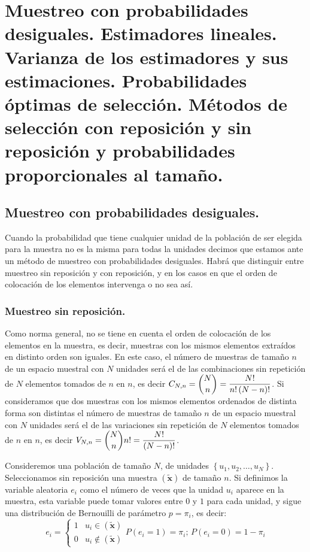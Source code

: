 
\chapter{Muestreo con probabilidades desiguales. Estimadores lineales. Varianza
de los estimadores y sus estimaciones. Probabilidades \'optimas de selecci\'on.
M\'etodos de selecci\'on con reposici\'on y sin reposici\'on y probabilidades
proporcionales al tama\~no.}


\section{Muestreo con probabilidades desiguales.}

Cuando la probabilidad que tiene cualquier unidad de la poblaci\'on
de ser elegida para la muestra no es la misma para todas la unidades
decimos que estamos ante un m\'etodo de muestreo con probabilidades
desiguales. Habr\'a que distinguir entre muestreo sin reposici\'on y con
reposici\'on, y en los casos en que el orden de colocaci\'on de los elementos
intervenga o no sea as\'i.


\subsection{Muestreo sin reposici\'on.}

Como norma general, no se tiene en cuenta el orden de colocaci\'on de
los elementos en la muestra, es decir, muestras con los mismos elementos
extra\'idos en distinto orden son iguales. En este caso, el n\'umero de
muestras de tama\~no $n$ de un espacio muestral con $N$ unidades ser\'a
el de las combinaciones sin repetici\'on de $N$ elementos tomados de
$n$ en $n$, es decir $C_{N,n}=\dbinom{N}{n}=\dfrac{N!}{n!\left(N-n\right)!}$.
Si consideramos que dos muestras con los mismos elementos ordenados
de distinta forma son distintas el n\'umero de muestras de tama\~no $n$
de un espacio muestral con $N$ unidades ser\'a el de las variaciones
sin repetici\'on de $N$ elementos tomados de $n$ en $n$, es decir
$V_{N,n}=\dbinom{N}{n}n!=\dfrac{N!}{\left(N-n\right)!}$.

Consideremos una poblaci\'on de tama\~no $N$, de unidades $\left\{ u_{1},u_{2},\ldots,u_{N}\right\} $.
Seleccionamos sin reposici\'on una muestra $\left(\widetilde{\boldsymbol{x}}\right)$
de tama\~no $n$. Si definimos la variable aleatoria $e_{i}$ como el
n\'umero de veces que la unidad $u_{i}$ aparece en la muestra, esta
variable puede tomar valores entre $0$ y $1$ para cada unidad, y
sigue una distribuci\'on de Bernouilli de par\'ametro $p=\pi_{i}$, es
decir: 
\[
e_{i}=\begin{cases}
1 & u_{i}\in\left(\widetilde{\boldsymbol{x}}\right)\\
0 & u_{i}\notin\left(\widetilde{\boldsymbol{x}}\right)
\end{cases}P\left(e_{i}=1\right)=\pi_{i};\,P\left(e_{i}=0\right)=1-\pi_{i}
\]


